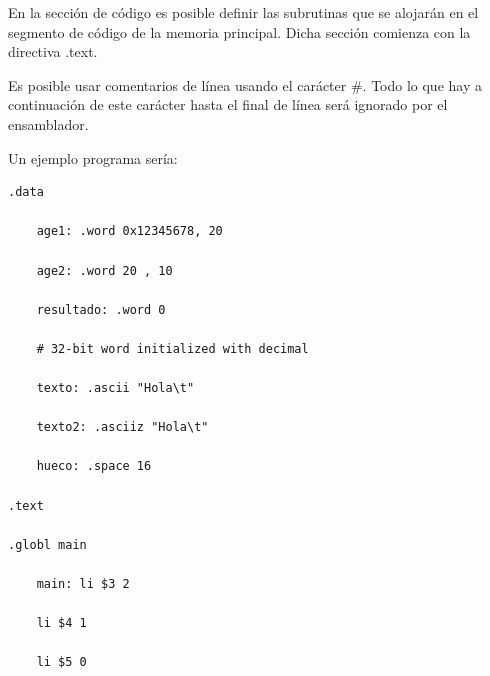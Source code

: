 En la sección de código es posible definir las subrutinas que se alojarán en el segmento de código de la memoria principal. Dicha sección comienza con la directiva .text.

Es posible usar comentarios de línea usando el carácter \#. Todo lo que hay a continuación de este carácter hasta el final de línea será ignorado por el ensamblador.

\vspace{4cm}

Un ejemplo programa sería:

\begin{lstlisting}
.data

	age1: .word 0x12345678, 20

	age2: .word 20 , 10

	resultado: .word 0

	# 32-bit word initialized with decimal

	texto: .ascii "Hola\t"

	texto2: .asciiz "Hola\t"

	hueco: .space 16

.text

.globl main

	main: li $3 2

	li $4 1

	li $5 0
\end{lstlisting}

\clearpage
